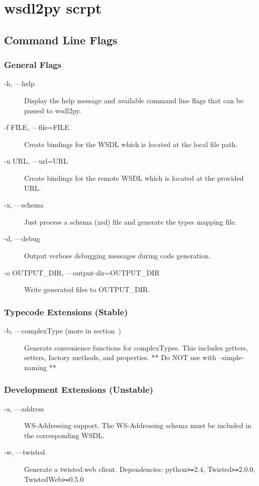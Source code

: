 \chapter{wsdl2py scrpt}

\section{Command Line Flags}

\subsection{General Flags}
\begin{description}
\item[-h, ---help] Display the help message and available command line
flags that can be passed to wsdl2py.
\item[-f FILE, ---file=FILE] Create bindings for the WSDL which is located at
the local file path.
\item[-u URL, ---url=URL] Create bindings for the remote WSDL which is located
at the provided URL.
\item[-x, ---schema] Just process a schema (xsd) file and generate the types
mapping file.
\item[-d, ---debug] Output verbose debugging messages during code generation.
\item[-o OUTPUT_DIR, ---output-dir=OUTPUT_DIR] Write generated files to OUTPUT_DIR.
\end{description}

\subsection{Typecode Extensions (Stable) }
\begin{description}
\item[-b, ---complexType (more in section~\label{subsubsection:complexType})]
Generate convenience functions for complexTypes.  This includes getters,
setters, factory methods, and properties.  ** Do NOT use with --simple-naming **
\end{description}

\subsection{Development Extensions (Unstable) }
\begin{description}
\item[-a, ---address] WS-Addressing support.  The WS-Addressing schema must be
included in the corresponding WSDL.
\item[-w, ---twisted] Generate a twisted.web client.  Dependencies:
python\verb!>=!2.4, Twisted\verb!>=!2.0.0, TwistedWeb\verb!>=!0.5.0
\end{description}

